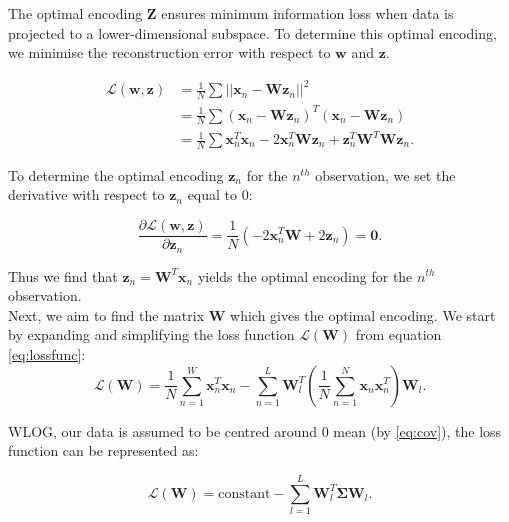\documentclass{article}\usepackage[]{graphicx}\usepackage[]{xcolor}
\numberwithin{equation}{section}
\begin{document}
{\noindent
The optimal encoding $\mathbf{Z}$ ensures minimum information loss when data is projected to a lower-dimensional subspace. To determine this optimal encoding, we minimise the reconstruction error with respect to $\mathbf{w}$ and $\mathbf{z}$.

\begin{equation}
\begin{aligned}
\mathcal{L}(\mathbf{w},\mathbf{z}) &= \frac{1}{N}\sum ||\mathbf{x}_n - \mathbf{W}\mathbf{z}_n||^2  \\
&= \frac{1}{N}\sum (\mathbf{x}_n - \mathbf{W}\mathbf{z}_n)^T(\mathbf{x}_n - \mathbf{W}\mathbf{z}_n)  \\
&= \frac{1}{N}\sum \mathbf{x}_n^T\mathbf{x}_n - 2\mathbf{x}_n^T\mathbf{W}\mathbf{z}_n+\mathbf{z}_n^T\mathbf{W}^T\mathbf{W}\mathbf{z}_n . \label{eq:lossfunc}
\end{aligned}
\end{equation}

\noindent
To determine the optimal encoding $\mathbf{z}_n$ for the $n^{th}$ observation, we set the derivative with respect to $\mathbf{z}_n $ equal to $0$:

$$\frac{\partial \mathcal{L}(\mathbf{w},\mathbf{z})}{\partial \mathbf{z}_n} = \frac{1}{N} (-2 \mathbf{x}_n^T\mathbf{W} + 2\mathbf{z}_n)= \mathbf{0}.$$

\noindent
Thus we find that $\mathbf{z}_n = \mathbf{W}^T\mathbf{x}_n$ yields the optimal encoding for the $n^{th}$ observation.\\

\noindent
Next, we aim to find the matrix $\mathbf{W}$ which gives the optimal encoding. We start by expanding and simplifying the loss function $\mathcal{L}(\mathbf{W})$ from equation \ref{eq:lossfunc}: \\

\begin{equation}
\mathcal{L}(\mathbf{W}) = \frac{1}{N} \sum_{n=1}^{W}\mathbf{x}_n^T\mathbf{x}_n - \sum_{n=1}^{L}\mathbf{W}_l^T(\frac{1}{N} \sum_{n=1}^{N}\mathbf{x}_n\mathbf{x}_n^T)\mathbf{W}_l.
\end{equation}

\noindent
WLOG, our data is assumed to be centred around $0$ mean (by \ref{eq:cov}), the loss function can be represented as:

\begin{equation}
\mathcal{L}(\mathbf{W}) = \mathrm{constant} - \sum_{l=1}^L\mathbf{W}_l^T\mathbf{\Sigma}\mathbf{W}_l.
\end{equation}

}
\end{document}
